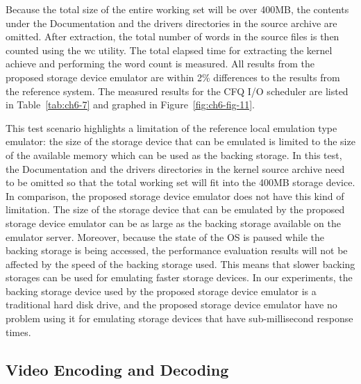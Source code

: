 Because the total size of the entire working set will be over 400MB, the contents under the Documentation and the drivers directories in the source archive are omitted. After extraction, the total number of words in the source files is then counted using the wc utility. The total elapsed time for extracting the kernel achieve and performing the word count is measured. All results from the proposed storage device emulator are within 2\% differences to the results from the reference system. The measured results for the CFQ I/O scheduler are listed in Table~\ref{tab:ch6-7} and graphed in Figure~\ref{fig:ch6-fig-11}.

This test scenario highlights a limitation of the reference local emulation type emulator: the size of the storage device that can be emulated is limited to the size of the available memory which can be used as the backing storage. In this test, the Documentation and the drivers directories in the kernel source archive need to be omitted so that the total working set will fit into the 400MB storage device. In comparison, the proposed storage device emulator does not have this kind of limitation. The size of the storage device that can be emulated by the proposed storage device emulator can be as large as the backing storage available on the emulator server. Moreover, because the state of the OS is paused while the backing storage is being accessed, the performance evaluation results will not be affected by the speed of the backing storage used. This means that slower backing storages can be used for emulating faster storage devices. In our experiments, the backing storage device used by the proposed storage device emulator is a traditional hard disk drive, and the proposed storage device emulator have no problem using it for emulating storage devices that have sub-millisecond response times.


\subsection{Video Encoding and Decoding}
\label{sec:ch6-6.6.4}

